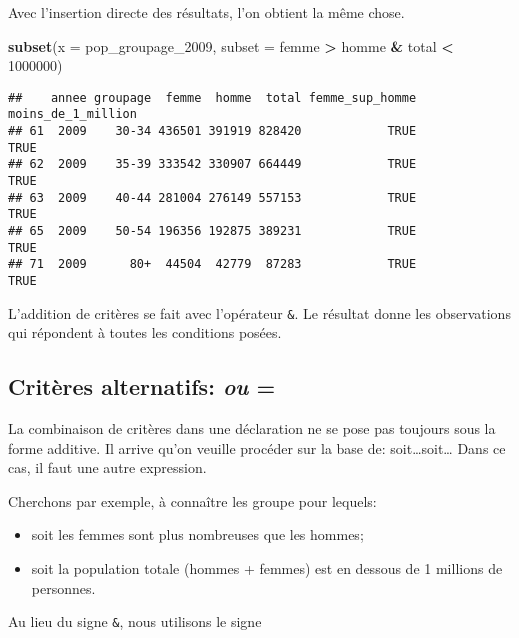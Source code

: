 \documentclass[]{book}
\newenvironment{Shaded}{\begin{snugshade}}{\end{snugshade}}
\newcommand{\KeywordTok}[1]{\textcolor[rgb]{0.13,0.29,0.53}{\textbf{#1}}}
\newcommand{\DataTypeTok}[1]{\textcolor[rgb]{0.13,0.29,0.53}{#1}}
\newcommand{\DecValTok}[1]{\textcolor[rgb]{0.00,0.00,0.81}{#1}}
\newcommand{\StringTok}[1]{\textcolor[rgb]{0.31,0.60,0.02}{#1}}
\newcommand{\OperatorTok}[1]{\textcolor[rgb]{0.81,0.36,0.00}{\textbf{#1}}}
\newcommand{\NormalTok}[1]{#1}
\begin{document}
Avec l'insertion directe des résultats, l'on obtient la même chose.

\begin{Shaded}
\begin{Highlighting}[]
\KeywordTok{subset}\NormalTok{(}\DataTypeTok{x =}\NormalTok{ pop_groupage_}\DecValTok{2009}\NormalTok{, }\DataTypeTok{subset =}\NormalTok{ femme }\OperatorTok{>}\StringTok{ }\NormalTok{homme }\OperatorTok{&}\StringTok{ }\NormalTok{total }\OperatorTok{<}\StringTok{ }\DecValTok{1000000}\NormalTok{)}
\end{Highlighting}
\end{Shaded}

\begin{verbatim}
##    annee groupage  femme  homme  total femme_sup_homme moins_de_1_million
## 61  2009    30-34 436501 391919 828420            TRUE               TRUE
## 62  2009    35-39 333542 330907 664449            TRUE               TRUE
## 63  2009    40-44 281004 276149 557153            TRUE               TRUE
## 65  2009    50-54 196356 192875 389231            TRUE               TRUE
## 71  2009      80+  44504  42779  87283            TRUE               TRUE
\end{verbatim}

L'addition de critères se fait avec l'opérateur \texttt{\&}. Le résultat
donne les observations qui répondent à toutes les conditions posées.

\subsection{\texorpdfstring{Critères alternatifs: \emph{ou} =
\texttt{\textbar{}}}{Critères alternatifs: ou = \textbar{}}}\label{criteres-alternatifs-ou}

La combinaison de critères dans une déclaration ne se pose pas toujours
sous la forme additive. Il arrive qu'on veuille procéder sur la base de:
soit\ldots{}soit\ldots{} Dans ce cas, il faut une autre expression.

Cherchons par exemple, à connaître les groupe pour lequels:

\begin{itemize}
\item
  soit les femmes sont plus nombreuses que les hommes;
\item
  soit la population totale (hommes + femmes) est en dessous de 1
  millions de personnes.
\end{itemize}

Au lieu du signe \texttt{\&}, nous utilisons le signe
\texttt{\textbar{}}
\end{document}
